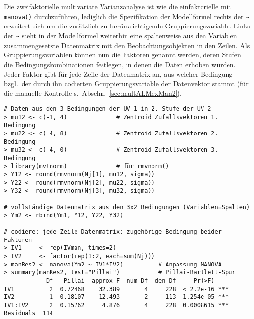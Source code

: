 Die zweifaktorielle multivariate Varianzanalyse ist wie die einfaktorielle mit \lstinline!manova()! durchzuführen, lediglich die Spezifikation der Modellformel rechts der \lstinline!~! erweitert sich um die zusätzlich zu berücksichtigende Gruppierungsvariable. Links der \lstinline!~! steht in der Modellformel weiterhin eine spaltenweise aus den Variablen zusammengesetzte Datenmatrix mit den Beobachtungsobjekten in den Zeilen. Als Gruppierungsvariablen können nun die Faktoren genannt werden, deren Stufen die Bedingungskombinationen festlegen, in denen die Daten erhoben wurden. Jeder Faktor gibt für jede Zeile der Datenmatrix an, aus welcher Bedingung bzgl.\ der durch ihn codierten Gruppierungsvariable der Datenvektor stammt (für die manuelle Kontrolle s.\ Abschn.\ \ref{sec:multALMexMan2}).
\begin{lstlisting}
# Daten aus den 3 Bedingungen der UV 1 in 2. Stufe der UV 2
> mu12 <- c(-1, 4)              # Zentroid Zufallsvektoren 1. Bedingung
> mu22 <- c( 4, 8)              # Zentroid Zufallsvektoren 2. Bedingung
> mu32 <- c( 4, 0)              # Zentroid Zufallsvektoren 3. Bedingung
> library(mvtnorm)              # für rmvnorm()
> Y12 <- round(rmvnorm(Nj[1], mu12, sigma))
> Y22 <- round(rmvnorm(Nj[2], mu22, sigma))
> Y32 <- round(rmvnorm(Nj[3], mu32, sigma))

# vollständige Datenmatrix aus den 3x2 Bedingungen (Variablen=Spalten)
> Ym2 <- rbind(Ym1, Y12, Y22, Y32)

# codiere: jede Zeile Datenmatrix: zugehörige Bedingung beider Faktoren
> IV1     <- rep(IVman, times=2)
> IV2     <- factor(rep(1:2, each=sum(Nj)))
> manRes2 <- manova(Ym2 ~ IV1*IV2)          # Anpassung MANOVA
> summary(manRes2, test="Pillai")           # Pillai-Bartlett-Spur
            Df   Pillai  approx F  num Df  den Df     Pr(>F)
IV1          2  0.72468    32.389       4     228  < 2.2e-16 ***
IV2          1  0.18107    12.493       2     113  1.254e-05 ***
IV1:IV2      2  0.15762     4.876       4     228  0.0008615 ***
Residuals  114
\end{lstlisting}

